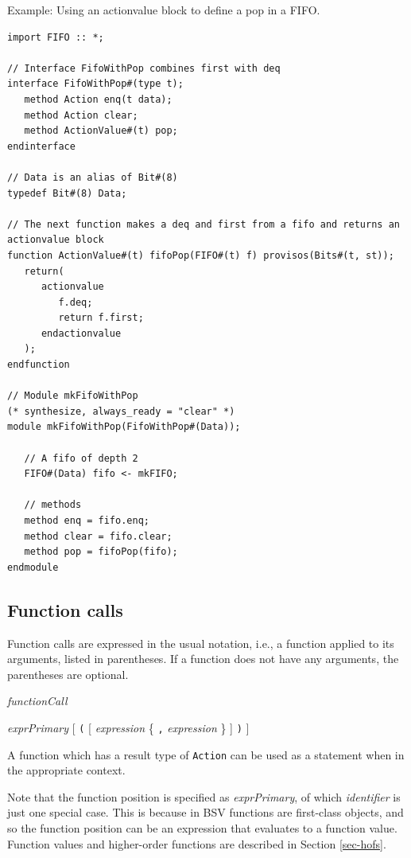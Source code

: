 \documentclass[twoside,letterpaper]{article}
\newcommand{\hm}{\hspace*{1em}}
\newcommand{\BSV}{BSV}
\newcommand{\te}[1]{\texttt{#1}}
\newcommand{\nterm}[1]{\emph{#1}}
\newcommand{\term}[1]{\texttt{#1}}
\newcommand{\many}[1]{\{ #1 \}}
\newcommand{\opt}[1]{[ #1 ]}
\newcommand{\gram}[2]{    \hm\makebox[10em][l]{\it #1}\makebox[1.5em][l]{::=}    #2}
\begin{document}
Example: Using an actionvalue block to define a pop in a FIFO.
\begin{verbatim}
import FIFO :: *;

// Interface FifoWithPop combines first with deq
interface FifoWithPop#(type t); 
   method Action enq(t data);
   method Action clear;
   method ActionValue#(t) pop;
endinterface

// Data is an alias of Bit#(8)
typedef Bit#(8) Data;

// The next function makes a deq and first from a fifo and returns an actionvalue block
function ActionValue#(t) fifoPop(FIFO#(t) f) provisos(Bits#(t, st));
   return(
      actionvalue
         f.deq;
         return f.first;
      endactionvalue
   );
endfunction

// Module mkFifoWithPop
(* synthesize, always_ready = "clear" *)
module mkFifoWithPop(FifoWithPop#(Data));

   // A fifo of depth 2
   FIFO#(Data) fifo <- mkFIFO;

   // methods
   method enq = fifo.enq;
   method clear = fifo.clear;
   method pop = fifoPop(fifo);
endmodule
\end{verbatim}


\subsection{Function calls}

Function calls are expressed in the usual notation,
i.e., a function applied to its arguments, listed in parentheses.  If
a function does not have any arguments, the parentheses are optional.

\gram{exprPrimary}{ \nterm{functionCall} }

\gram{functionCall}{ \nterm{exprPrimary}
                    \opt{ \term{(} \opt{
                       \nterm{expression} \many{ \term{,} \nterm{expression}} }
                       \term{)} }}

A function which has a result type of \te{Action} can be used as a
statement when in the appropriate context.



Note that the function position is specified as \nterm{exprPrimary},
of which \nterm{identifier} is just one special case.  This is because
in {\BSV} functions are first-class objects, and so the function
position can be an expression that evaluates to a function value.
Function values and higher-order functions are described in Section
\ref{sec-hofs}.  
\end{document}
